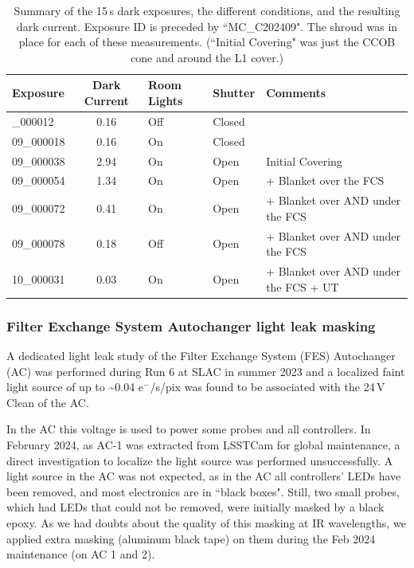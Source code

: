 \begin{longtable}{|l|c|l|l|l|}
\caption{Summary of the 15\,s dark exposures, the different conditions, and the resulting dark current.
Exposure ID is preceded by ``MC\_C202409".  The shroud was in place for each of these measurements.  (``Initial Covering" was just the CCOB cone and around the L1 cover.) \label{tab:leak_chasing}} \\
\hline
\textbf{Exposure} & \textbf{Dark Current} & \textbf{Room Lights} &\textbf{Shutter} & \textbf{Comments} \\

\hline
\endfirsthead
\hline
\hline
\endhead
\hline
\endfoot
\hline
09\_000012 & 0.16 & Off & Closed & \\
09\_000018 & 0.16 & On & Closed & \\
09\_000038 & 2.94 & On & Open & Initial Covering  \\
09\_000054 & 1.34 & On & Open &  + Blanket over the FCS \\
09\_000072 & 0.41 & On & Open &  + Blanket over AND under the FCS \\
09\_000078 & 0.18 & Off & Open & + Blanket over AND under the FCS \\
10\_000031 & 0.03 & On & Open &  + Blanket over AND under the FCS + UT \\

\end{longtable}


\subsubsection{Filter Exchange System Autochanger light leak
masking}\label{successful-autochanger-light-leaks-masking}

A dedicated light leak study of the Filter Exchange System (FES) Autochanger (AC) was performed during Run 6 at SLAC
in summer 2023 and a localized faint light source of up to
\textasciitilde{}0.04 e$^-$/s/pix was found to be associated with the 24\,V Clean of
the AC.

In the AC this voltage is used to power some probes and all
controllers. In February 2024, as AC-1 was extracted from LSSTCam for
global maintenance, a direct investigation to localize the light
source was performed unsuccessfully. A light source in the AC
was not expected, as in the AC all controllers' LEDs have
been removed, and most electronics are in ``black boxes". Still, two small
probes, which had LEDs that could not be removed, were initially masked
by a black epoxy. As we had doubts about the quality of this masking at
IR wavelengths, we applied extra masking (aluminum black tape) on them during
the Feb 2024 maintenance (on AC 1 and 2).

